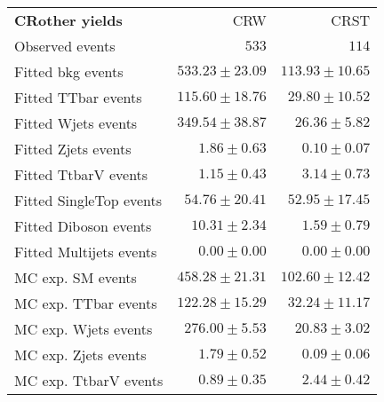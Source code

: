 

\begin{table}
\begin{center}
\setlength{\tabcolsep}{0.0pc}
{\small
\begin{tabular*}{\textwidth}{@{\extracolsep{\fill}}lrr}
\noalign{\smallskip}\hline\noalign{\smallskip}
{\bf CRother yields}           & CRW            & CRST              \\[-0.05cm]
\noalign{\smallskip}\hline\noalign{\smallskip}
Observed events          & $533$              & $114$                    \\
\noalign{\smallskip}\hline\noalign{\smallskip}
Fitted bkg events         & $533.23 \pm 23.09$          & $113.93 \pm 10.65$              \\
\noalign{\smallskip}\hline\noalign{\smallskip}
        Fitted TTbar events         & $115.60 \pm 18.76$          & $29.80 \pm 10.52$              \\
        Fitted Wjets events         & $349.54 \pm 38.87$          & $26.36 \pm 5.82$              \\
        Fitted Zjets events         & $1.86 \pm 0.63$          & $0.10 \pm 0.07$              \\
        Fitted TtbarV events         & $1.15 \pm 0.43$          & $3.14 \pm 0.73$              \\
        Fitted SingleTop events         & $54.76 \pm 20.41$          & $52.95 \pm 17.45$              \\
        Fitted Diboson events         & $10.31 \pm 2.34$          & $1.59 \pm 0.79$              \\
        Fitted Multijets events         & $0.00 \pm 0.00$          & $0.00 \pm 0.00$              \\
 \noalign{\smallskip}\hline\noalign{\smallskip}
MC exp. SM events              & $458.28 \pm 21.31$          & $102.60 \pm 12.42$              \\
\noalign{\smallskip}\hline\noalign{\smallskip}
        MC exp. TTbar events         & $122.28 \pm 15.29$          & $32.24 \pm 11.17$              \\
        MC exp. Wjets events         & $276.00 \pm 5.53$          & $20.83 \pm 3.02$              \\
        MC exp. Zjets events         & $1.79 \pm 0.52$          & $0.09 \pm 0.06$              \\
        MC exp. TtbarV events         & $0.89 \pm 0.35$          & $2.44 \pm 0.42$              \\

\end{tabular*}}
\end{center}
\end{table}

